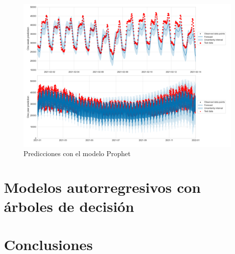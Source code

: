 \documentclass[12pt,twoside]{article}
\begin{document}
\newpage
\begin{center}
\begin{figure}[h]
    \includegraphics[width = \textwidth]{imagenes/prophet_pred2.png}
    \caption{Predicciones con el modelo Prophet}\label{fig:prophet_pred2}
\end{figure}
\end{center}






\newpage
\section{Modelos autorregresivos con árboles de decisión}


\newpage
\section{Conclusiones}




\end{document}
